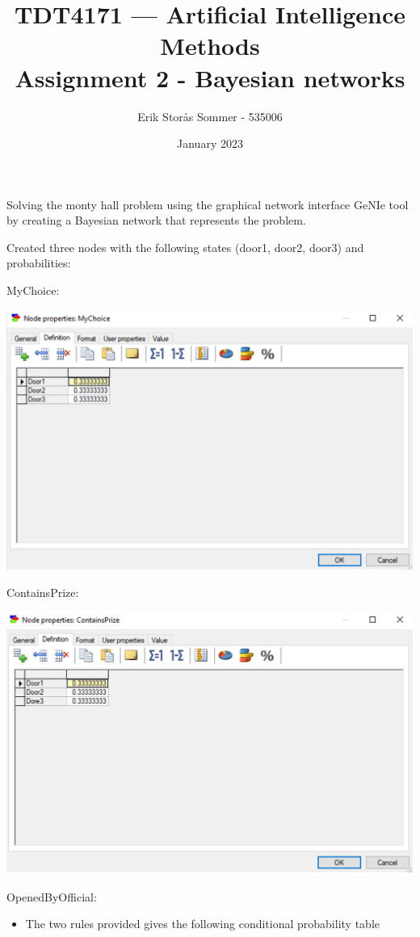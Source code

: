 \documentclass{article}
\title{TDT4171 — Artificial Intelligence Methods \\ Assignment 2 - Bayesian networks}
\author{Erik Storås Sommer - 535006}
\date{January 2023}
\begin{document}
\maketitle

Solving the monty hall problem using the graphical network interface GeNIe tool by creating a Bayesian network that represents the problem.

Created three nodes with the following states (door1, door2, door3) and probabilities:

MyChoice:

\includegraphics[width=\linewidth]{mychoice.png}

ContainsPrize:

\includegraphics[width=\linewidth]{containsprize.png}

OpenedByOfficial:

\begin{itemize}
    \item The two rules provided gives the following conditional probability table
\end{itemize}
\end{document}
